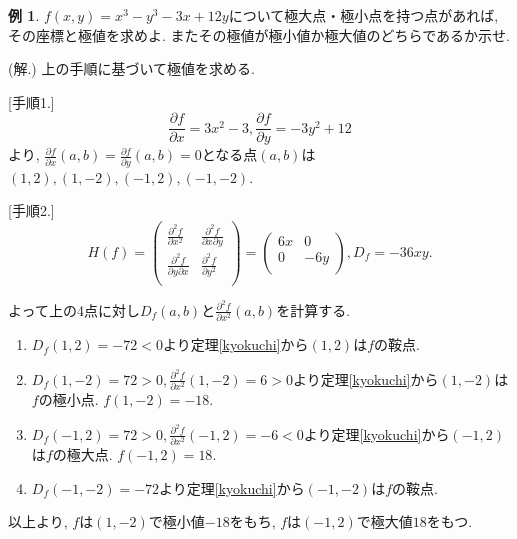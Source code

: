 \documentclass[dvipdfmx,a4paper,11pt]{article}
\theoremstyle{definition}
\newtheorem{exa}[thm]{例}
\newcommand{\pdrv}[2]{\frac{\partial #1}{\partial #2}}
\newcommand{\ppdrv}[3]{\frac{\partial #1}{\partial #2 \partial #3}}
\begin{document}
\begin{exa}
$f(x,y) = x^3 -y^3 -3x +12y$について極大点・極小点を持つ点があれば, その座標と極値を求めよ. またその極値が極小値か極大値のどちらであるか示せ.

(解.) 上の手順に基づいて極値を求める.

[手順1.] 
$$\pdrv{f}{x} = 3x^2 -3, \pdrv{f}{y} = -3y^2 +12$$より, 
$\pdrv{f}{x}(a,b) = \pdrv{f}{y}(a,b) = 0$となる点$(a,b)$は
$(1,2), (1,-2), (-1,2), (-1,-2)$.

[手順2.]
$$H(f) = \left(\begin{array}{cc} \pdrv{^2f}{x^2}& \ppdrv{^2 f}{x}{y}\\ 
\ppdrv{^2 f}{y}{x}& \pdrv{^2f}{y^2}\\ \end{array} \right)
=
\left(\begin{array}{cc} 6x& 0\\ 
0& -6y \\ \end{array} \right), D_f = -36xy.
$$

よって上の4点に対し$D_f(a,b)$と$\pdrv{^2f}{x^2}(a,b) $を計算する.
\begin{enumerate}
\item $D_f(1,2) = -72 <0$より定理\ref{kyokuchi}から$(1,2)$は$f$の鞍点.
\item $D_f(1,-2) = 72 >0, \pdrv{^2f}{x^2}(1,-2) =6 >0$より定理\ref{kyokuchi}から$(1,-2)$は$f$の極小点. $f(1,-2)=-18$.
\item $D_f(-1,2) = 72 >0, \pdrv{^2f}{x^2}(-1,2) =-6 <0$より定理\ref{kyokuchi}から$(-1,2)$は$f$の極大点. $f(-1,2)=18$.
\item $D_f(-1,-2) = -72$より定理\ref{kyokuchi}から$(-1,-2)$は$f$の鞍点.
\end{enumerate}

以上より, $f$は$(1,-2)$で極小値$-18$をもち, $f$は$(-1,2)$で極大値$18$をもつ.
\end{exa}
\end{document}
